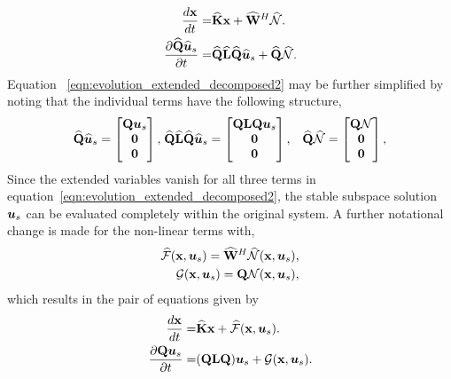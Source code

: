 \begin{subequations}
	\begin{align}
		\dfrac{d\mathbf{x}}{d t} =& \mathbf{\widehat{K}}\mathbf{x} + \mathbf{\widehat{W}}^{H}\mathcal{\widehat{N}} \label{eqn:evolution_extended_decomposed1}.\\
		\dfrac{\partial \mathbf{\widehat{Q}} {\widehat{\boldsymbol{u}}}_{s}}{\partial t} =& \mathbf{\widehat{Q}}\mathbf{\widehat{L}} \mathbf{\widehat{Q}}{\widehat{\boldsymbol{u}}}_{s} + \mathbf{\widehat{Q}}\mathcal{\widehat{N}}
		 \label{eqn:evolution_extended_decomposed2}. 
	\end{align}
\end{subequations}
Equation~ \eqref{eqn:evolution_extended_decomposed2} may be further simplified by noting that the individual terms have the following structure,
\begin{align}
		\mathbf{\widehat{Q}}{\widehat{\boldsymbol{u}}}_{s} = 
		\begin{bmatrix}
			\mathbf{Q}\boldsymbol{u}_{s} \\
			\boldsymbol{0} \\
			\boldsymbol{0} 
		\end{bmatrix}, &
		\hspace{1mm} \mathbf{\widehat{Q}}\mathbf{\widehat{L}}\mathbf{\widehat{Q}}{\widehat{\boldsymbol{u}}}_{s} = 
		\begin{bmatrix}
			\mathbf{Q}\mathbf{L}\mathbf{Q}\boldsymbol{u}_{s} \\
			\boldsymbol{0} \\
			\boldsymbol{0} 
		\end{bmatrix}, &
		\mathbf{\widehat{Q}}\mathcal{\widehat{N}} = 
		\begin{bmatrix}
			\mathbf{Q}\mathcal{N} \\
			\boldsymbol{0} \\
			\boldsymbol{0} 
		\end{bmatrix},	
	\nonumber
\end{align}
Since the extended variables vanish for all three terms in equation~\eqref{eqn:evolution_extended_decomposed2}, the stable subspace solution $\boldsymbol{u}_{s}$ can be evaluated completely within the original system. A further notational change is made for the non-linear terms with,
\begin{eqnarray}
	\mathcal{\widehat{F}}(\mathbf{x},\boldsymbol{u}_{s}) = \mathbf{\widehat{W}}^{H}\mathcal{\widehat{N}}(\mathbf{x},\boldsymbol{u}_{s}), \nonumber \\
	\mathcal{G}(\mathbf{x},\boldsymbol{u}_{s}) = \mathbf{Q}\mathcal{N}(\mathbf{x},\boldsymbol{u}_{s}), \nonumber
\end{eqnarray} 
which results in the pair of equations given by
\begin{subequations}
	\begin{align}
		\dfrac{d\mathbf{x}}{d t} =& \mathbf{\widehat{K}}\mathbf{x} + \mathcal{\widehat{F}}(\mathbf{x},\boldsymbol{u}_{s}) \label{eqn:evolution_final1}.\\
		\dfrac{\partial \mathbf{Q}\boldsymbol{u}_{s}}{\partial t} =& (\mathbf{Q}\mathbf{L} \mathbf{Q})\boldsymbol{u}_{s} + \mathcal{G}(\mathbf{x},\boldsymbol{u}_{s})
		\label{eqn:evolution_final2}. 
	\end{align}
	\label{eqn:evolution_final}
\end{subequations}
 
